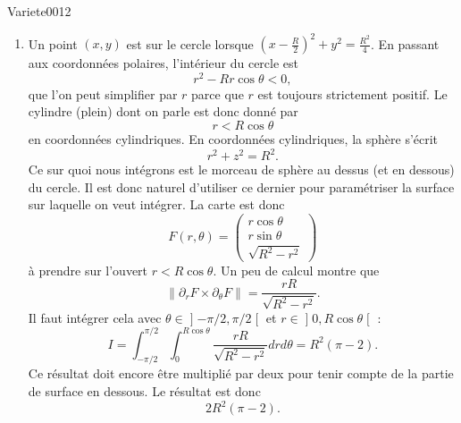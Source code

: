 \begin{corrige}{Variete0012}
\begin{enumerate}
		\item
			Un point $(x,y)$ est sur le cercle lorsque $(x-\frac{ R }{ 2 })^2+y^2=\frac{ R^2 }{ 4 }$. En passant aux coordonnées polaires, l'intérieur du cercle est
			\begin{equation}
				r^2-Rr\cos\theta<0,
			\end{equation}
			que l'on peut simplifier par $r$ parce que $r$ est toujours strictement positif. Le cylindre (plein) dont on parle est donc donné par
			\begin{equation}
				r<R\cos\theta
			\end{equation}
			en coordonnées cylindriques. En coordonnées cylindriques, la sphère s'écrit
			\begin{equation}
				r^2+z^2=R^2.
			\end{equation}
			Ce sur quoi nous intégrons est le morceau de sphère au dessus (et en dessous) du cercle. Il est donc naturel d'utiliser ce dernier pour paramétriser la surface sur laquelle on veut intégrer. La carte est donc
			\begin{equation}		\label{EqParmsCylSphere}
				F(r,\theta)=\begin{pmatrix}
					r\cos\theta	\\ 
					r\sin\theta	\\ 
					\sqrt{R^2-r^2}	
				\end{pmatrix}
			\end{equation}
			à prendre sur l'ouvert $r<R\cos\theta$. Un peu de calcul montre que
			\begin{equation}
				\| \partial_rF\times\partial_{\theta}F \|=\frac{ rR }{ \sqrt{R^2-r^2} }.
			\end{equation}
			Il faut intégrer cela avec $\theta\in\mathopen] -\pi/2 , \pi/2 \mathclose[$ et $r\in\mathopen] 0 , R\cos\theta \mathclose[$ :
			\begin{equation}
				I=\int_{-\pi/2}^{\pi/2}\int_0^{R\cos\theta}\frac{ rR }{ \sqrt{R^2-r^2} }drd\theta=R^2(\pi-2).
			\end{equation}
			Ce résultat doit encore être multiplié par deux pour tenir compte de la partie de surface en dessous. Le résultat est donc
			\begin{equation}
				2R^2(\pi-2).
			\end{equation}
			

\end{enumerate}
\end{corrige}
